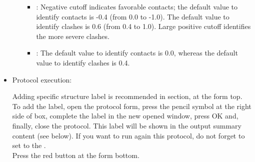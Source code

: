 \begin{itemize}
\begin{itemize}
            \begin{itemize}
            \item {}: Negative cutoff indicates favorable contacts; the default value to identify contacts is -0.4 (from 0.0 to -1.0). The default value to identify clashes is 0.6 (from 0.4 to 1.0). Large positive cutoff identifies the more severe clashes.
            \item {}: The default value to identify contacts is 0.0, whereas the default value to identify clashes is 0.4.
            \end{itemize}

    \end{itemize}

  \item Protocol execution:
  
  Adding specific structure label is recommended in  section, at the form top. To add the label, open the protocol form, press the pencil symbol at the right side of  box, complete the label in the new opened window, press OK and, finally, close the protocol. This label will be shown in the output summary content (see below). If you want to run again this protocol, do not forget to set to  the .\\
  Press the  red button at the form bottom.
  

\end{itemize}
